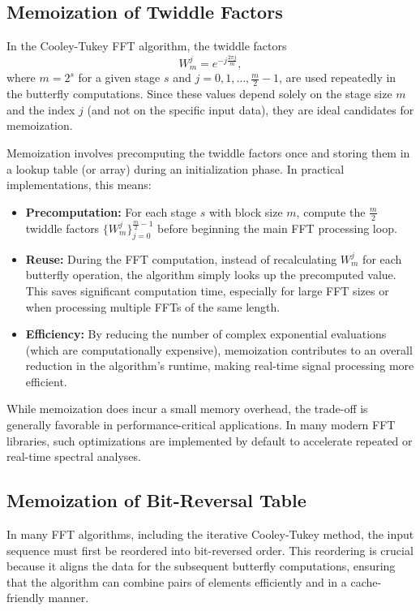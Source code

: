 \documentclass[12pt,letter]{article}
\begin{document}
\subsection{Memoization of Twiddle Factors}

In the Cooley-Tukey FFT algorithm, the twiddle factors
\[
W_m^j = e^{-j\frac{2\pi j}{m}},
\]
where \( m = 2^s \) for a given stage \( s \) and
\( j = 0, 1, \ldots, \frac{m}{2}-1 \), are used repeatedly in the butterfly
computations. Since these values depend solely on the stage size \( m \) and
the index \( j \) (and not on the specific input data), they are ideal
candidates for memoization.

Memoization involves precomputing the twiddle factors once and storing them
in a lookup table (or array) during an initialization phase. In practical
implementations, this means:
\begin{itemize}
  \item \textbf{Precomputation:} For each stage \( s \) with block size
  \( m \), compute the \( \frac{m}{2} \) twiddle factors
  \( \{W_m^j\}_{j=0}^{\frac{m}{2}-1} \) before beginning the main FFT
  processing loop.
  \item \textbf{Reuse:} During the FFT computation, instead of recalculating
  \( W_m^j \) for each butterfly operation, the algorithm simply looks up the
  precomputed value. This saves significant computation time, especially for
  large FFT sizes or when processing multiple FFTs of the same length.
  \item \textbf{Efficiency:} By reducing the number of complex exponential
  evaluations (which are computationally expensive), memoization contributes
  to an overall reduction in the algorithm's runtime, making real-time signal
  processing more efficient.
\end{itemize}

While memoization does incur a small memory overhead, the trade-off is
generally favorable in performance-critical applications. In many modern FFT
libraries, such optimizations are implemented by default to accelerate
repeated or real-time spectral analyses.

\subsection{Memoization of Bit-Reversal Table}

In many FFT algorithms, including the iterative Cooley-Tukey method, the input
sequence must first be reordered into bit-reversed order. This reordering is
crucial because it aligns the data for the subsequent butterfly computations,
ensuring that the algorithm can combine pairs of elements efficiently and in a
cache-friendly manner.
\end{document}
